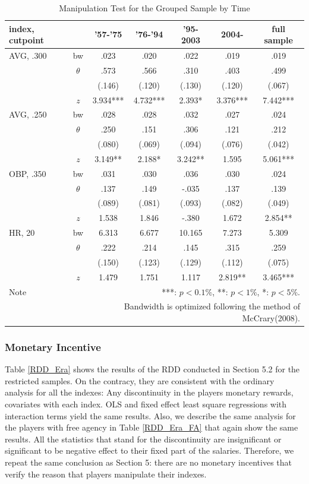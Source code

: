 \documentclass[dvipdfmx, 12pt]{article}
\begin{document}
\begin{table}
  \centering
  \caption{Manipulation Test for the Grouped Sample by Time}
  \label{Mani-Era}
  \footnotesize
  \begin{tabular}{lcccccc} \hline
    index, cutpoint &  & '57-'75 &'76-'94 & '95-2003 & 2004- &full sample \\ \hline \hline
    AVG, .300 & bw & .023 & .020 & .022 & .019 & .019 \\
    & $\theta$ & .573 & .566 & .310 & .403 & .499 \\
    & & (.146) & (.120) & (.130) & (.120) & (.067) \\
    & $z$ & 3.934*** & 4.732*** & 2.393* & 3.376*** & 7.442*** \\ \hline
    AVG, .250 & bw & .028 & .028 & .032 & .027 & .024 \\
    & $\theta$ & .250 & .151 & .306 & .121 & .212 \\
    & & (.080) & (.069) & (.094)& (.076) & (.042) \\
    & $z$ & 3.149** & 2.188* & 3.242** & 1.595 & 5.061*** \\ \hline
    OBP, .350 & bw & .031 & .030 & .036 & .030 & .024 \\
    & $\theta$ & .137 & .149 & -.035 & .137 & .139 \\
    & & (.089) & (.081) & (.093) & (.082) & (.049) \\
    & $z$ & 1.538 & 1.846 & -.380 & 1.672 & 2.854** \\ \hline
    HR, 20 & bw & 6.313 & 6.677 & 10.165 & 7.273 & 5.309 \\
    & $\theta$ & .222 & .214 & .145 & .315 & .259 \\
    & & (.150) & (.123) & (.129) & (.112) & (.075) \\
    & $z$ & 1.479 & 1.751 & 1.117 & 2.819** & 3.465*** \\ \hline
    Note & \multicolumn{6}{r}{
    ***: $p<0.1\%$, **: $p<1\%$, *: $p<5\%$.
    }\\
    & \multicolumn{6}{r}{
    Bandwidth is optimized following the method of McCrary(2008).
    }
  \end{tabular}
\end{table}

\subsubsection{Monetary Incentive}

Table \ref{RDD_Era} shows the results of the RDD conducted in Section 5.2 for the restricted samples. On the contracy, they are consistent with the ordinary analysis for all the indexes: Any discontinuity in the players monetary rewards, covariates with each index. OLS and fixed effect least square regressions with interaction terms yield the same results. Also, we describe the same analysis for the players with free agency in Table \ref{RDD_Era_FA} that again show the same results. All the statistics that stand for the discontinuity are insignificant or significant to be negative effect to their fixed part of the salaries. Therefore, we repeat the same conclusion as Section 5: there are no monetary incentives that verify the reason that players manipulate their indexes.
\end{document}
